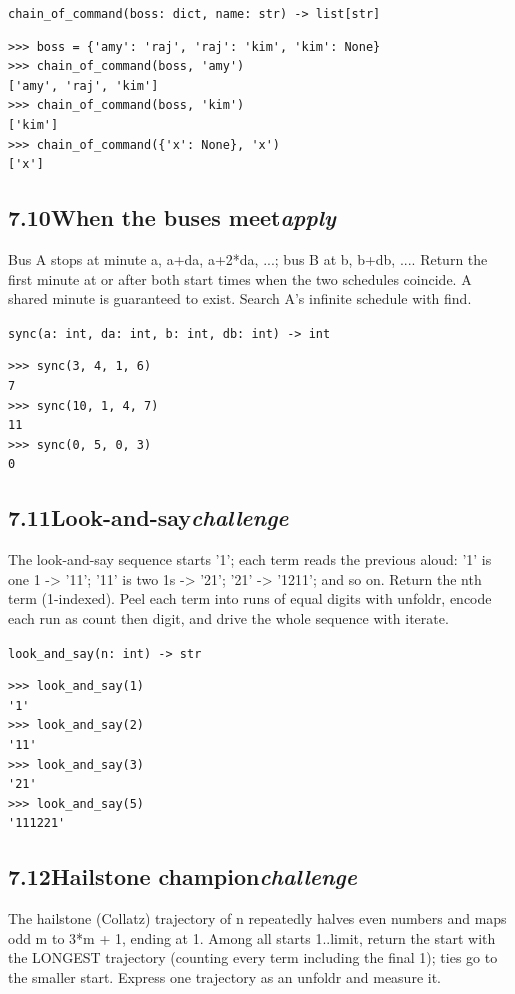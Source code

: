 \documentclass[10pt,letterpaper]{book}
\begin{document}
\noindent\texttt{chain\_of\_command(boss: dict, name: str) -> list[str]}
\begin{lstlisting}[style=ex]
>>> boss = {'amy': 'raj', 'raj': 'kim', 'kim': None}
>>> chain_of_command(boss, 'amy')
['amy', 'raj', 'kim']
>>> chain_of_command(boss, 'kim')
['kim']
>>> chain_of_command({'x': None}, 'x')
['x']
\end{lstlisting}
\subsection*{7.10\quad When the buses meet\hfill\textnormal{\textit{apply}}}
Bus A stops at minute a, a+da, a+2*da, ...; bus B at b, b+db, .... Return the first minute at or after both start times when the two schedules coincide. A shared minute is guaranteed to exist. Search A's infinite schedule with find.

\noindent\texttt{sync(a: int, da: int, b: int, db: int) -> int}
\begin{lstlisting}[style=ex]
>>> sync(3, 4, 1, 6)
7
>>> sync(10, 1, 4, 7)
11
>>> sync(0, 5, 0, 3)
0
\end{lstlisting}
\subsection*{7.11\quad Look-and-say\hfill\textnormal{\textit{challenge}}}
The look-and-say sequence starts '1'; each term reads the previous aloud: '1' is one 1 -> '11'; '11' is two 1s -> '21'; '21' -> '1211'; and so on. Return the nth term (1-indexed). Peel each term into runs of equal digits with unfoldr, encode each run as count then digit, and drive the whole sequence with iterate.

\noindent\texttt{look\_and\_say(n: int) -> str}
\begin{lstlisting}[style=ex]
>>> look_and_say(1)
'1'
>>> look_and_say(2)
'11'
>>> look_and_say(3)
'21'
>>> look_and_say(5)
'111221'
\end{lstlisting}

\subsection*{7.12\quad Hailstone champion\hfill\textnormal{\textit{challenge}}}
The hailstone (Collatz) trajectory of n repeatedly halves even numbers and maps odd m to 3*m + 1, ending at 1. Among all starts 1..limit, return the start with the LONGEST trajectory (counting every term including the final 1); ties go to the smaller start. Express one trajectory as an unfoldr and measure it.
\end{document}
